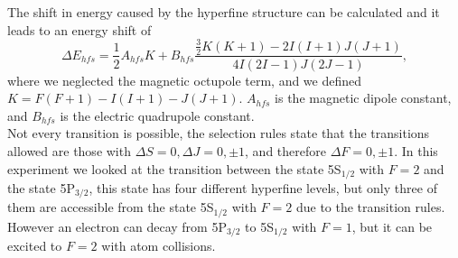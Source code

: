 \documentclass[a4paper,10pt]{article}
\begin{document}
The shift in energy caused by the hyperfine structure can be calculated and it leads to an energy shift of
\begin{equation}\label{hfs}\Delta E_{hfs} = \frac{1}{2}A_{hfs}K + B_{hfs}\frac{\frac{3}{2}K(K+1)-2I(I+1)J(J+1)}{4I(2I-1)J(2J-1)},\end{equation}
where we neglected the magnetic octupole term, and we defined $K=F(F+1)-I(I+1)-J(J+1)$. $A_{hfs}$ is the magnetic dipole constant, and $B_{hfs}$ is the electric quadrupole constant.\\
Not every transition is possible, the selection rules state that the transitions allowed are those with $\Delta S = 0,\Delta J=0,\pm 1$, and therefore $\Delta F = 0,\pm 1$. In this experiment we looked at the transition between the state 5S$_{1/2}$ with $F=2$ and the state 5P$_{3/2}$, this state has four different hyperfine levels, but only three of them are accessible from the state 5S$_{1/2}$ with $F=2$ due to the transition rules. However an electron can decay from 5P$_{3/2}$ to 5S$_{1/2}$ with $F=1$, but it can be excited to $F=2$ with atom collisions. 
\end{document}
